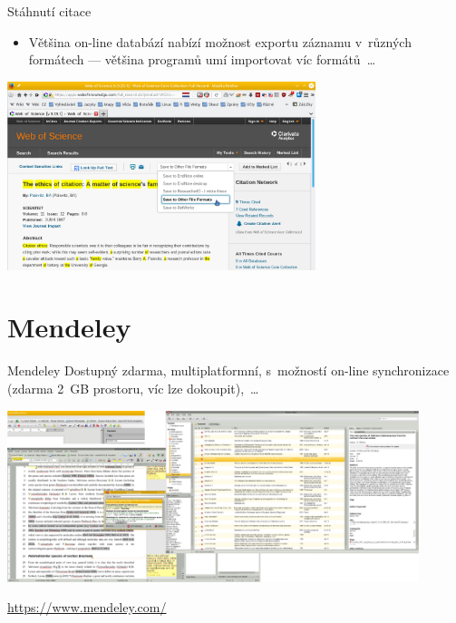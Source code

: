 \documentclass[compress, ucs, xelatex, 11pt, xcolor=svgnames, aspectratio=169,
	hyperref={
		bookmarks=true,
		unicode=true,
		colorlinks=true,
		pdftitle={Citacni software},
		plainpages=false,
		pdfauthor={Vojtech Zeisek},
		pdfsubject={Kratky uvod do citacniho software},
		pdfcreator={XeLaTeX},
		pdfkeywords={citace, reference, software, literatura},
		linkcolor=Crimson, %
		anchorcolor=Magenta, %
		citecolor=Magenta, %
		filecolor=Magenta, %
		menucolor=Magenta, %
		urlcolor=DarkTurquoise, %
		pdftex},
	url={hyphens, lowtilde} %
	]{beamer}
\begin{document}
\begin{frame}{Stáhnutí citace}
	\begin{itemize}
		\item Většina on-line databází nabízí možnost exportu záznamu v~různých formátech --- většina programů umí importovat víc formátů~\ldots
	\end{itemize}
	\begin{center}
		\includegraphics[height=5.5cm]{export_z_wos.png}
	\end{center}
\end{frame}

\section{Mendeley}

\begin{frame}{Mendeley}
        Dostupný zdarma, multiplatformní, s~možností on-line synchronizace (zdarma 2~GB prostoru, víc lze dokoupit),~\ldots\\
        \begin{center}
                \includegraphics[height=5cm]{mendeley.png}
        \end{center}
        \flushright\url{https://www.mendeley.com/}
\end{frame}
\end{document}
